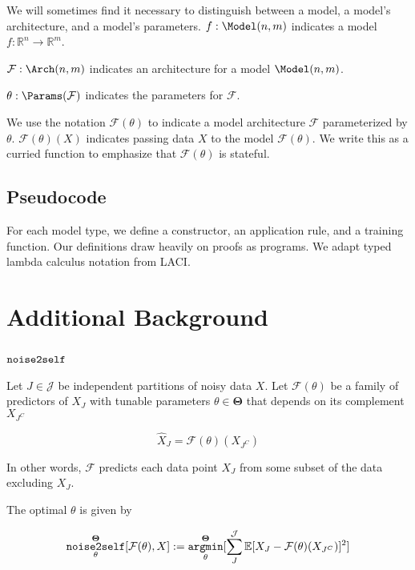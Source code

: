 We will sometimes find it necessary to distinguish between a model, a model's architecture, and a model's parameters.
$f:\Model(n,m)$ indicates a model $f:\mathbb{R}^n \to \mathbb{R}^m$.

$\mathcal{F}:\Arch(n,m)$ indicates an architecture for a model $\Model(n,m)$.

$\theta:\Params(\mathcal{F})$ indicates the parameters for $\mathcal{F}$.

We use the notation $\mathcal{F}(\theta)$ to indicate a model architecture $\mathcal{F}$ parameterized by $\theta$.
$\mathcal{F}(\theta)(X)$ indicates passing data $X$ to the model $\mathcal{F}(\theta)$.
We write this as a curried function to emphasize that $\mathcal{F}(\theta)$ is stateful.

\subsection{Pseudocode}

For each model type, we define a constructor, an application rule, and a training function.
Our definitions draw heavily on proofs as programs\cite{MARTINLOF1982153}.
We adapt typed lambda calculus notation from LACI\cite{LACI}.

\section{Additional Background}

\subsection{$\mathop{\mathtt{noise2self}}\limits$}
\label{app:ntos}


Let $J \in \mathcal{J}$ be independent partitions of noisy data $X$. Let $\mathcal{F}(\theta)$ be a family of predictors of $X_J$ with tunable parameters $\theta \in \mathbf{\Theta}$ that depends on its complement $X_{J^C}$

\begin{equation}
  \hat{X}_J=\mathcal{F}(\theta)(X_{J^C})
\end{equation}

In other words, $\mathcal{F}$ predicts each data point $X_J$ from some subset of the data excluding $X_J$. 

  The optimal $\theta$ is given by

\begin{equation}
  \label{eq:ntos}
  \mathop{\mathtt{noise2self}}\limits_\theta^{\mathbf{\Theta}}[\mathcal{F}(\theta),X] := \mathop{\mathtt{argmin}}\limits_\theta^{\mathbf{\Theta}}[\sum_{J}^{\mathcal{J}}\mathbb{E}[X_J-\mathcal{F}(\theta)(X_{J^C})]^2]
\end{equation}

